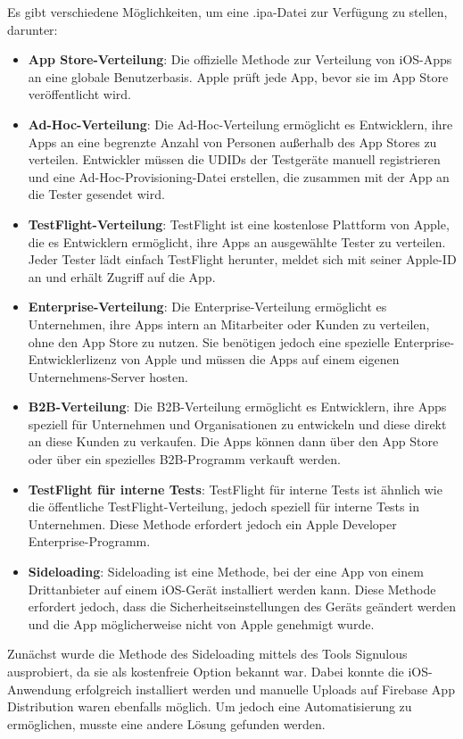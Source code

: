 Es gibt verschiedene Möglichkeiten, um eine .ipa-Datei zur
Verfügung zu stellen, darunter:

\begin{itemize}
  \item \textbf{App Store-Verteilung}: Die offizielle Methode zur Verteilung von iOS-Apps an eine globale Benutzerbasis. Apple prüft jede App, bevor sie im App Store veröffentlicht wird.
  \item \textbf{Ad-Hoc-Verteilung}: Die Ad-Hoc-Verteilung ermöglicht es Entwicklern, ihre Apps an eine begrenzte Anzahl von Personen außerhalb des App Stores zu verteilen. Entwickler müssen die UDIDs der Testgeräte manuell registrieren und eine Ad-Hoc-Provisioning-Datei erstellen, die zusammen mit der App an die Tester gesendet wird.
  \item \textbf{TestFlight-Verteilung}: TestFlight ist eine kostenlose Plattform von Apple, die es Entwicklern ermöglicht, ihre Apps an ausgewählte Tester zu verteilen. Jeder Tester lädt einfach TestFlight herunter, meldet sich mit seiner Apple-ID an und erhält Zugriff auf die App.
  \item \textbf{Enterprise-Verteilung}: Die Enterprise-Verteilung ermöglicht es Unternehmen, ihre Apps intern an Mitarbeiter oder Kunden zu verteilen, ohne den App Store zu nutzen. Sie benötigen jedoch eine spezielle Enterprise-Entwicklerlizenz von Apple und müssen die Apps auf einem eigenen Unternehmens-Server hosten.
  \item \textbf{B2B-Verteilung}: Die B2B-Verteilung ermöglicht es Entwicklern, ihre Apps speziell für Unternehmen und Organisationen zu entwickeln und diese direkt an diese Kunden zu verkaufen. Die Apps können dann über den App Store oder über ein spezielles B2B-Programm verkauft werden.
  \item \textbf{TestFlight für interne Tests}: TestFlight für interne Tests ist ähnlich wie die öffentliche TestFlight-Verteilung, jedoch speziell für interne Tests in Unternehmen. Diese Methode erfordert jedoch ein Apple Developer Enterprise-Programm.
  \item \textbf{Sideloading}: Sideloading ist eine Methode, bei der eine App von einem Drittanbieter auf einem iOS-Gerät installiert werden kann. Diese Methode erfordert jedoch, dass die Sicherheitseinstellungen des Geräts geändert werden und die App möglicherweise nicht von Apple genehmigt wurde.
\end{itemize}

Zunächst wurde die Methode des Sideloading mittels des
Tools \cite{signulous} Signulous ausprobiert,
da sie als kostenfreie Option bekannt war. Dabei konnte
die iOS-Anwendung erfolgreich installiert werden und
manuelle Uploads auf Firebase App Distribution waren
ebenfalls möglich. Um jedoch eine Automatisierung zu
ermöglichen, musste eine andere Lösung gefunden werden.

